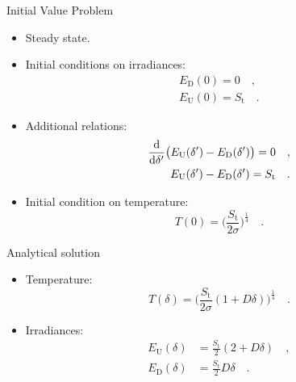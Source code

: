 \documentclass[aspectratio=43]{beamer}
\begin{document}
\begin{frame}{Initial Value Problem}
  \begin{itemize}
    \item<1-> Steady state.
    \item<2-> Initial conditions on irradiances:
      \begin{align}
        \label{eq:initial_downward}
        E_\text{D}(0) = 0 \quad , \\
        \label{eq:initial_upward}
        E_\text{U}(0) = S_\text{t}
        \quad .
      \end{align}
    \item<3-> Additional relations:
      \begin{align}
        \label{eq:irradiance_steady_state}
        \odv*{\big( E_\text{U}(\delta') - E_\text{D}(\delta') \big)}{\delta'} = 0
        \quad , \\
        \label{eq:irradiance_steady_state_solution}
        E_\text{U}(\delta') - E_\text{D}(\delta') = S_\text{t}
        \quad .
      \end{align}
    \item<4-> Initial condition on temperature:
      \begin{equation}
        \label{eq:initial_temperature}
        T(0) = \bigg( \frac{S_\text{t}}{2 \sigma} \bigg)^\frac{1}{4}
        \quad .
      \end{equation}
  \end{itemize}
\end{frame}

\begin{frame}{Analytical solution}
  \begin{itemize}
    \item Temperature:
      \begin{equation}
        \label{eq:temperature_analytical_solution}
        T(\delta) = \bigg( \frac{S_\text{t}}{2 \sigma} (1 + D \delta) \bigg)^\frac{1}{4}
        \quad .
      \end{equation}
    \item Irradiances:
      \begin{align}
        \label{eq:irradiance_upward_solution}
        E_\text{U}(\delta) & = \frac{S_\text{t}}{2} (2 + D \delta) \quad , \\
        \label{eq:irradiance_downward_solution}
        E_\text{D}(\delta) & = \frac{S_\text{t}}{2} D \delta
        \quad .
      \end{align}
  \end{itemize}
\end{frame}
\end{document}
